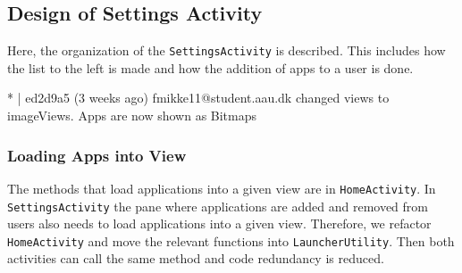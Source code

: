 \subsection{Design of Settings Activity}\label{sec:sprint3:designsettings}
Here, the organization of the \lstinline!SettingsActivity! is described.
This includes how the list to the left is made and how the addition of apps to a user is done. 



* | ed2d9a5 (3 weeks ago) fmikke11@student.aau.dk changed views to imageViews. Apps are now shown as Bitmaps\\ 

\subsubsection{Loading Apps into View}\label{sec:sprint:designlauncher}

The methods that load applications into a given view are in \lstinline!HomeActivity!.
In \lstinline!SettingsActivity! the pane where applications are added and removed from users also needs to load applications into a given view.
Therefore, we refactor \lstinline!HomeActivity! and move the relevant functions into \lstinline!LauncherUtility!.
Then both activities can call the same method and code redundancy is reduced. 